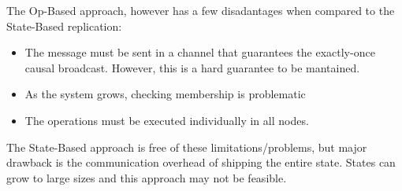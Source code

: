 The Op-Based approach, however has a few disadantages when compared to the State-Based replication:

\begin{itemize}
    \item The message must be sent in a channel that guarantees the exactly-once causal broadcast. However, this is a hard guarantee to be mantained. 
    \item As the system grows, checking membership is problematic
    \item The operations must be executed individually in all nodes.
\end{itemize}

The State-Based approach is free of these limitations/problems, but major drawback is the communication overhead of shipping the entire state. States can grow to large sizes and this approach may not be feasible. 

